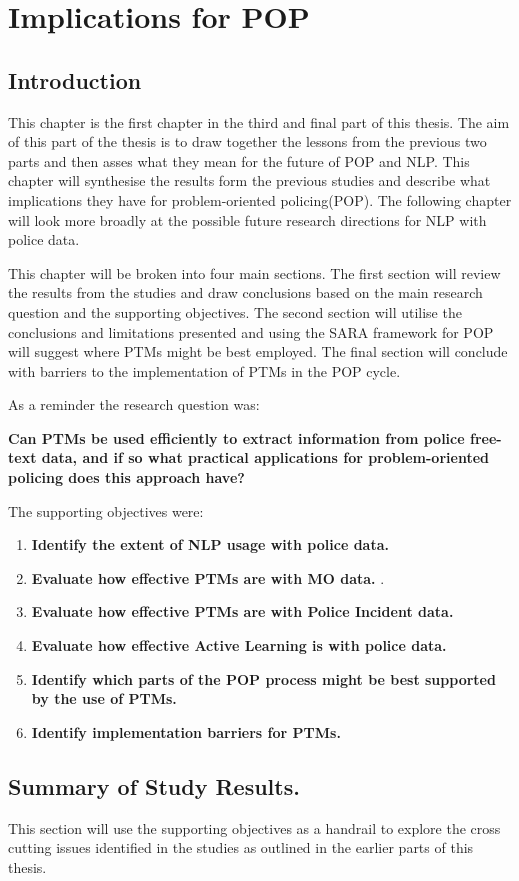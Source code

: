 \chapter{Implications for POP}


\section{Introduction} This chapter is the first chapter in the third and final part of this thesis. The aim of this part of the thesis is to draw together the lessons from the previous two parts and then asses what they mean for the future of POP and NLP.  This chapter will synthesise the results form the previous studies and describe what implications they have for problem-oriented policing(POP). The following chapter will look more broadly at the possible future research directions for NLP with police data.

This chapter will be broken into four main sections. The first section will review the results from the studies and draw conclusions based on the main research question and the supporting objectives. The second section will utilise the conclusions and limitations presented and using the SARA framework for POP will suggest where PTMs might be best employed. The final section will conclude with barriers to the implementation of PTMs in the POP cycle.

As a reminder the research question was:

\textbf{Can PTMs be used efficiently to extract information from police free-text data, and if so what practical applications for problem-oriented policing does this approach have?}

The supporting objectives were:
\begin{enumerate}
\item {\bf Identify the extent of NLP usage with police data.} 
\item {\bf Evaluate how effective PTMs are with MO data.} .
\item {\bf Evaluate how effective PTMs are with Police Incident data.} 
\item {\bf Evaluate how effective Active Learning is with police data.}  
\item {\bf Identify which parts of the POP process might be best supported by the use of PTMs.} 
\item {\bf Identify implementation barriers for PTMs.} 
\end{enumerate}

\section{Summary of Study Results.} This section will use the supporting objectives as a handrail to explore the cross cutting issues identified in the studies as outlined in the earlier parts of this thesis.

